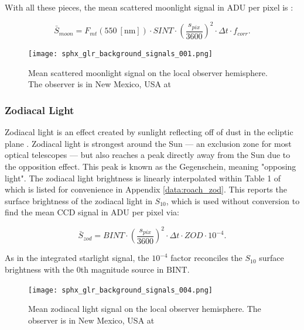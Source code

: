 With all these pieces, the mean scattered moonlight signal in ADU per pixel is \cite{krag2003}:

\begin{equation} \label{eq:moonlight_adu}
  \bar{S}_{moon} = F_{mt}(550 \: \left[\textrm{nm}\right]) \cdot SINT \cdot \left( \frac{s_{pix}}{3600} \right)^2 \cdot \Delta t \cdot f_{corr}.
\end{equation}

\begin{figure}[ht]
  \centering
  \texttt{[image: sphx\_glr\_background\_signals\_001.png]}
  \caption{Mean scattered moonlight signal on the local observer hemisphere. The observer is in New Mexico, USA at
  \pogslla}
  \label{fig:moonlight_hemi}
\end{figure}

\subsubsection{Zodiacal Light}

Zodiacal light is an effect created by sunlight reflecting off of dust in the ecliptic plane \cite{krag2003}. Zodiacal light is strongest around the Sun --- an exclusion zone for most optical telescopes --- but also reaches a peak directly away from the Sun due to the opposition effect. This peak is known as the Gegenschein, meaning "opposing light". The zodiacal light brightness is linearly interpolated within Table 1 of \cite{roach1972} which is listed for convenience in Appendix \ref{data:roach_zod}. This reports the surface brightness of the zodiacal light in $S_{10}$, which is used without conversion to find the mean CCD signal in ADU per pixel via:

\begin{equation} \label{eq:zodiacal_adu}
  \bar{S}_{zod} = BINT \cdot \left( \frac{s_{pix}}{3600} \right)^2 \cdot \Delta t \cdot ZOD \cdot 10^{-4}.
\end{equation}

As in the integrated starlight signal, the $10^{-4}$ factor reconciles the $S_{10}$ surface brightness with the 0th magnitude source in $\textrm{BINT}$. 

\begin{figure}[ht]
  \centering
  \texttt{[image: sphx\_glr\_background\_signals\_004.png]}
  \caption{Mean zodiacal light signal on the local observer hemisphere. The observer is in New Mexico, USA at
  \pogslla}
  \label{fig:zod_hemi}
\end{figure}

